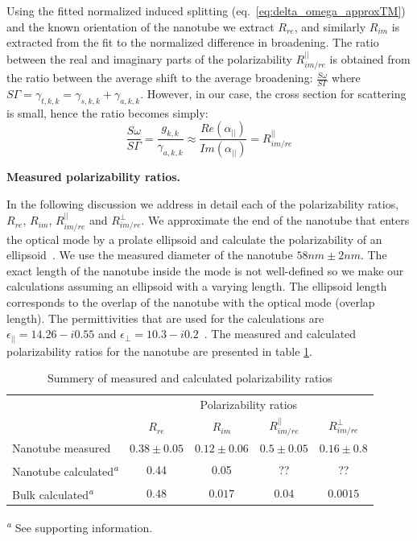 \documentclass[journal=jacsat,manuscript=article]{achemso}
\begin{document}
Using the fitted normalized induced splitting (eq.~\ref{eq:delta_omega_approxTM}) and the known orientation of the nanotube we extract $R_{re}$, and similarly $R_{im}$ is extracted from the fit to the normalized difference in broadening.
The ratio between the real and imaginary parts of the polarizability $R_{im/re}^{||}$
is obtained from the ratio between the average shift to the average broadening: $\frac{\textit{S} \omega} {\textit{S} \Gamma}$ where $\textit{S} \Gamma= \gamma_{t,k,k}=\gamma_{s,k,k}+\gamma_{a,k,k}$. However, in our case,  the cross section for scattering is small, hence the ratio becomes simply:
\begin{equation}\label{eq:Rre_im_noscatt}
   \frac{\textit{S} \omega} {\textit{S} \Gamma}=\frac{g_{k,k}}{\gamma_{a,k,k}}\approx \frac{Re ( \alpha_{||} )}{Im (\alpha_{||})} = R_{im/re}^{||}
\end{equation}

\textbf{Measured polarizability ratios.}

In the following discussion we address in detail each of the polarizability ratios, $R_{re}$, $R_{im}$, $R_{im/re}^{||}$ and $R_{im/re}^{\perp}$. We approximate the end of the nanotube that enters the optical mode by a prolate ellipsoid and calculate the polarizability of an ellipsoid~\cite{hulst1957light}. We use the measured diameter of the nanotube $58nm \pm 2nm$. The exact length of the nanotube inside the mode is not well-defined so we make our calculations assuming an ellipsoid with a varying length. The ellipsoid length corresponds to the overlap of the nanotube with the optical mode (overlap length).  The permittivities that are used for the calculations are $\epsilon_{||}=14.26-i0.55$ and $\epsilon_{\perp}=10.3-i0.2$~\cite{taverna2002}. The measured and calculated polarizability ratios for the nanotube are presented in table \ref{tbl:PR}.

\begin{table}[H]
  \caption{Summery of measured and calculated polarizability ratios}
  \label{tbl:PR}
  \begin{tabular}{lcccc}
    \hline
     & \multicolumn{4}{c}{Polarizability ratios}\\
                                & $R_{re}$ & $R_{im}$ & $R_{im/re}^{||}$ & $R_{im/re}^{\perp}$ \\
    \hline
    Nanotube measured  & $0.38 \pm 0.05$ &  $0.12 \pm 0.06$ & $0.5 \pm 0.05$ & $0.16 \pm 0.8$ \\
    Nanotube calculated\textsuperscript{\emph{a}}  & 0.44 &  0.05 & ?? & ?? \\
    Bulk calculated\textsuperscript{\emph{a}}  & $0.48$ &  $0.017$ & $0.04$ & $0.0015$ \\
    \hline
  \end{tabular}
  
  \textsuperscript{\emph{a}} See supporting information.
\end{table}
\end{document}
